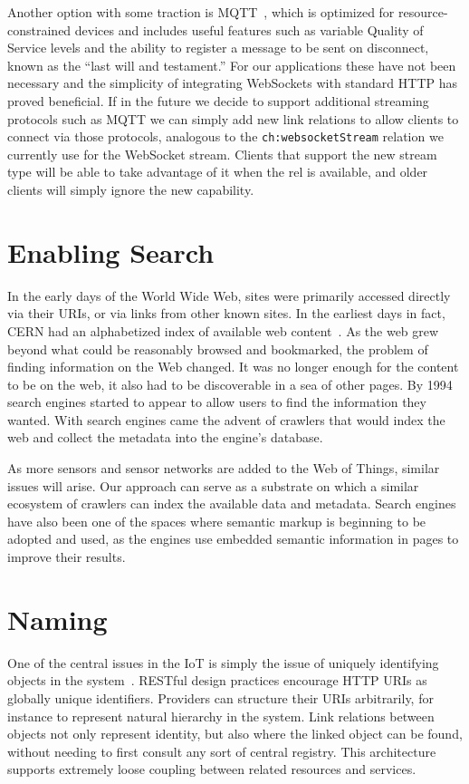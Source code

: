 \documentclass{acm_proc_article-sp}
\begin{document}
Another option with some traction is MQTT~\cite{collina2012}, which is
optimized for resource-constrained devices and includes useful features such as
variable Quality of Service levels and the ability to register a message to be
sent on disconnect, known as the ``last will and testament.'' For our
applications these have not been necessary and the simplicity of integrating
WebSockets with standard HTTP has proved beneficial. If in the future we decide
to support additional streaming protocols such as MQTT we can simply add new
link relations to allow clients to connect via those protocols, analogous to
the \texttt{ch:websocketStream} relation we currently use for the WebSocket
stream. Clients that support the new stream type will be able to take advantage
of it when the rel is available, and older clients will simply ignore the new
capability.

\section{Enabling Search}
\label{search}

In the early days of the World Wide Web, sites were primarily accessed directly
via their URIs, or via links from other known sites. In the earliest days in
fact, CERN had an alphabetized index of available web
content~\cite{websearchengines}. As the web grew beyond what could be
reasonably browsed and bookmarked, the problem of finding information on the
Web changed. It was no longer enough for the content to be on the web, it also
had to be discoverable in a sea of other pages. By 1994 search engines started
to appear to allow users to find the information they wanted. With search
engines came the advent of crawlers that would index the web and collect the
metadata into the engine's database.

As more sensors and sensor networks are added to the Web of Things, similar
issues will arise. Our approach can serve as a substrate on which a similar
ecosystem of crawlers can index the available data and metadata. Search engines
have also been one of the spaces where semantic markup is beginning to be
adopted and used,  as the engines use embedded semantic information in pages to
improve their results.

\section{Naming}

One of the central issues in the IoT is simply the issue of uniquely
identifying objects in the system~\cite{iotsurvey}. RESTful design practices
encourage HTTP URIs as globally unique identifiers. Providers can structure
their URIs arbitrarily, for instance to represent natural hierarchy in the
system. Link relations between objects not only represent identity, but also
where the linked object can be found, without needing to first consult any sort
of central registry. This architecture supports extremely loose coupling
between related resources and services.
\end{document}
